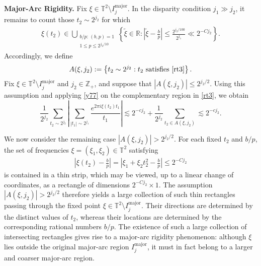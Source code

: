 \documentclass[11 pt,letterpaper]{amsart}
\theoremstyle{plain}
\theoremstyle{definition}
\theoremstyle{remark} \theoremstyle{exam} \theoremstyle{ob}
\numberwithin{equation}{section}
\begin{document}
\noindent\textbf{Major-Arc Rigidity.}
Fix $\xi\in \mathbb{T}^2\setminus I^{\mathrm{major}}_{j}$.  In the disparity condition $j_1\gg j_2$, it remains to count those $t_2 \sim 2^{j_2}$ for which  	\begin{align}\label{rt3} 
	\xi(t_2) \in \bigcup_{\substack{b/p:\,(b,p)=1\\ 1\le p\le 2^{j_2/10}}} \left\{ \widetilde{\xi}\in\mathbb{R}: \left| \widetilde{\xi}-\frac{b}{p} \right| \le \frac{2^{j_2/100}}{2^{j_1}} \ll 2^{-Cj_2} \right\}.
\end{align}
Accordingly, we define \begin{align*} 
	A(\xi,j_2) := \left\{ t_2\sim 2^{j_2}: t_2 \text{ satisfies \eqref{rt3}} \right\}. 
	\end{align*} Fix $\xi\in\mathbb{T}^2\setminus I_j^{\mathrm{major}}$ and $j_2\in\mathbb{Z}_+$, and suppose that $|A(\xi,j_2)|\leq 2^{j_2/2}.$ Using this assumption and  applying  \eqref{y77} on the complementary region in \eqref{rt3}, we obtain $$\frac{1}{2^{j_2}}\sum_{t_2\sim 2^{j_2}}\left|\sum_{|t_1|\sim 2^{j_1}}\frac{e^{2\pi i\xi(t_2)t_1}}{t_1}\right|\lesssim 2^{-cj_2}+ \frac{1}{2^{j_2}}\sum_{t_2\in A(\xi,j_2)}\lesssim  2^{-cj_2}.$$


We now consider the remaining case $|A(\xi,j_2)|>2^{j_2/2}.$
For each fixed $t_2$ and $b/p$, the set of frequencies
$\xi=(\xi_1,\xi_2)\in\mathbb{T}^2$ satisfying
\begin{align*}
	\left|
	\xi(t_2)-\frac{b}{p}
	\right|
	=
	\left|
	\xi_1+\xi_2t_2^2-\frac{b}{p}
	\right|
	\le 2^{-Cj_2}
\end{align*}
is contained in a thin strip, which may be viewed, up to a linear
change of coordinates, as a rectangle of dimensions
$2^{-Cj_2}\times 1$.
The assumption $|A(\xi,j_2)|>2^{j_2/2}$ therefore yields a large
collection of such thin rectangles passing through the fixed point
$
\xi\in\mathbb{T}^2\setminus I_j^{\mathrm{major}}.$
Their directions are determined by the distinct values of $t_2$,
whereas their locations are determined by the corresponding rational
numbers $b/p$. The existence of such a large collection of intersecting
rectangles gives rise to a major-arc rigidity phenomenon: although
$\xi$ lies outside the original major-arc region
$I_j^{\mathrm{major}}$, it must in fact belong to a larger and coarser
major-arc region.
\end{document}
